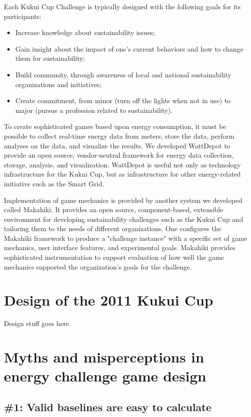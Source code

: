 \documentclass[man]{apa} %
\begin{document}
Each Kukui Cup Challenge is typically designed with the following goals for its
participants:
\begin{itemize}
\item Increase knowledge about sustainability issues;
\item Gain insight about the impact of one's current behaviors and how to change them for sustainability;
\item Build community, through awareness of local and national sustainability organizations and initiatives;
\item Create commitment, from minor (turn off the lights when not in use) to major (pursue a profession related to sustainability).
\end{itemize}

To create sophisticated games based upon energy consumption, it must be possible to
collect real-time energy data from meters, store the data, perform analyses on the data, and
visualize the results. We developed WattDepot to provide an open source, vendor-neutral
framework for energy data collection, storage, analysis, and visualization.  WattDepot is
useful not only as technology infrastructure for the Kukui Cup, but as infrastructure for
other energy-related initiative such as the Smart Grid.

Implementation of game mechanics is provided by another system we developed called
Makahiki.  It provides an open source, component-based, extensible environment for
developing sustainability challenges such as the Kukui Cup and tailoring them to the needs
of different organizations.  One configures the Makahiki framework to produce a "challenge
instance" with a specific set of game mechanics, user interface features, and experimental
goals.  Makahiki provides sophisticated instrumentation to support evaluation of how well
the game mechanics supported the organization's goals for the challenge.


\section{Design of the 2011 Kukui Cup}

Design stuff goes here.


\section{Myths and misperceptions in energy challenge game design}

\subsection{\#1: Valid baselines are easy to calculate}
\end{document}
